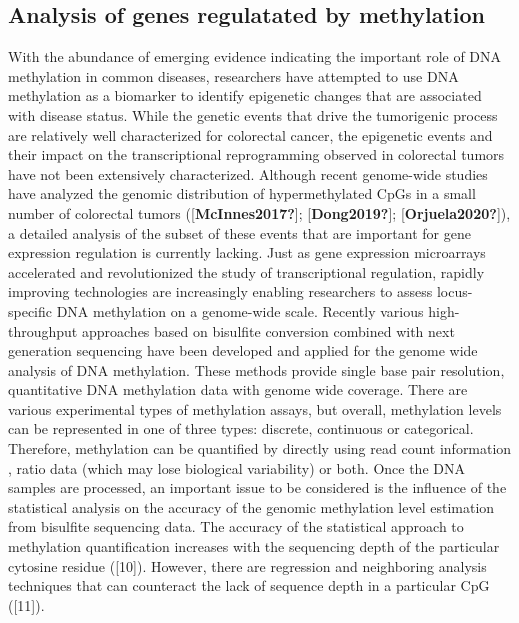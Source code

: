 \documentclass[10pt,letterpaper]{article}
\begin{document}
\hypertarget{analysis-of-genes-regulatated-by-methylation}{%
\subsection{Analysis of genes regulatated by
methylation}\label{analysis-of-genes-regulatated-by-methylation}}

With the abundance of emerging evidence indicating the important role of
DNA methylation in common diseases, researchers have attempted to use
DNA methylation as a biomarker to identify epigenetic changes that are
associated with disease status. While the genetic events that drive the
tumorigenic process are relatively well characterized for colorectal
cancer, the epigenetic events and their impact on the transcriptional
reprogramming observed in colorectal tumors have not been extensively
characterized. Although recent genome-wide studies have analyzed the
genomic distribution of hypermethylated CpGs in a small number of
colorectal tumors ({[}\textbf{McInnes2017?}{]};
{[}\textbf{Dong2019?}{]}; {[}\textbf{Orjuela2020?}{]}), a detailed
analysis of the subset of these events that are important for gene
expression regulation is currently lacking. Just as gene expression
microarrays accelerated and revolutionized the study of transcriptional
regulation, rapidly improving technologies are increasingly enabling
researchers to assess locus-specific DNA methylation on a genome-wide
scale. Recently various high-throughput approaches based on bisulfite
conversion combined with next generation sequencing have been developed
and applied for the genome wide analysis of DNA methylation. These
methods provide single base pair resolution, quantitative DNA
methylation data with genome wide coverage. There are various
experimental types of methylation assays, but overall, methylation
levels can be represented in one of three types: discrete, continuous or
categorical. Therefore, methylation can be quantified by directly using
read count information , ratio data (which may lose biological
variability) or both. Once the DNA samples are processed, an important
issue to be considered is the influence of the statistical analysis on
the accuracy of the genomic methylation level estimation from bisulfite
sequencing data. The accuracy of the statistical approach to methylation
quantification increases with the sequencing depth of the particular
cytosine residue ({[}10{]}). However, there are regression and
neighboring analysis techniques that can counteract the lack of sequence
depth in a particular CpG ({[}11{]}).
\end{document}
